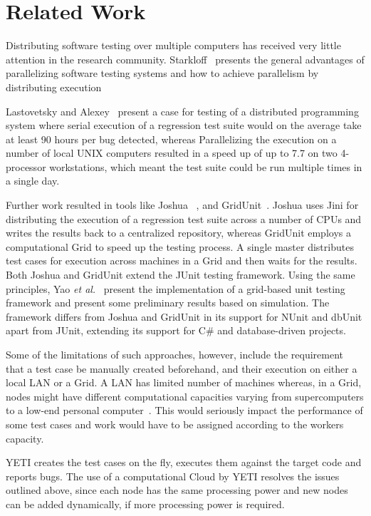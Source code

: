 \section{Related Work}\label{sec:rw}
Distributing software testing over multiple computers has received very little attention in the research community. Starkloff~\cite{stark} presents the general advantages of parallelizing software testing systems and how to achieve parallelism by distributing execution 

Lastovetsky and Alexey~\cite{lasto} present a case for testing of a distributed programming system where serial execution of a regression test suite would on the average take at least 90 hours per bug detected, whereas Parallelizing the execution on a number of local UNIX computers resulted in a speed up of up to 7.7 on two 4-processor workstations, which meant the test suite could be run multiple times in a single day.

Further work resulted in tools like Joshua ~\cite{Kap}, and GridUnit~\cite{Duarte1, Duarte2, Duarte3}. 
Joshua uses Jini for distributing the execution of a regression test suite across a number of CPUs and 
writes the results back to a centralized repository, whereas GridUnit employs a computational Grid to speed up the testing process. 
A single master distributes test cases for execution across machines in a Grid and then waits for the results.
Both Joshua and GridUnit extend the JUnit testing framework. Using the same principles, Yao \textit{et al.}~\cite{yao} present the implementation of a grid-based unit testing framework and present some preliminary results based on simulation. 
The framework  differs from Joshua and GridUnit in its support for NUnit and dbUnit apart from JUnit, extending its support for C\# and database-driven projects.

Some of the limitations of such approaches, however, include the requirement that a test case be manually created beforehand, and their execution on either a local LAN or a Grid. A LAN has limited number of machines whereas, in a Grid, nodes might have different computational capacities varying from supercomputers to a low-end personal computer~\cite{yao}. This would seriously impact the performance 
of some test cases and work would have to be assigned according to the workers capacity. 


YETI creates the test cases on the fly, executes them against the target code and reports bugs. The use of a computational Cloud by YETI resolves the issues outlined above, since each node has the same processing power and new nodes can be added dynamically, if more processing power is required. 



